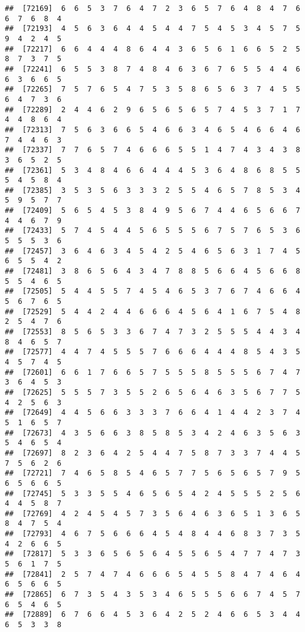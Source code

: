 \documentclass[
]{book}
\begin{document}
\begin{verbatim}
##  [72169]  6  6  5  3  7  6  4  7  2  3  6  5  7  6  4  8  4  7  6  6  7  6  8  4
##  [72193]  4  5  6  3  6  4  4  5  4  4  7  5  4  5  3  4  5  7  5  9  4  2  4  5
##  [72217]  6  6  4  4  4  8  6  4  4  3  6  5  6  1  6  6  5  2  5  8  7  3  7  5
##  [72241]  6  5  5  3  8  7  4  8  4  6  3  6  7  6  5  5  4  4  6  6  3  6  6  5
##  [72265]  7  5  7  6  5  4  7  5  3  5  8  6  5  6  3  7  4  5  5  6  4  7  3  6
##  [72289]  2  4  4  6  2  9  6  5  6  5  6  5  7  4  5  3  7  1  7  4  4  8  6  4
##  [72313]  7  5  6  3  6  6  5  4  6  6  3  4  6  5  4  6  6  4  6  7  4  4  6  3
##  [72337]  7  7  6  5  7  4  6  6  6  5  5  1  4  7  4  3  4  3  8  3  6  5  2  5
##  [72361]  5  3  4  8  4  6  6  4  4  4  5  3  6  4  8  6  8  5  5  5  4  5  8  4
##  [72385]  3  5  3  5  6  3  3  3  2  5  5  4  6  5  7  8  5  3  4  5  9  5  7  7
##  [72409]  5  6  5  4  5  3  8  4  9  5  6  7  4  4  6  5  6  6  7  4  4  6  7  9
##  [72433]  5  7  4  5  4  4  5  6  5  5  5  6  7  5  7  6  5  3  6  5  5  5  3  6
##  [72457]  3  6  4  6  3  4  5  4  2  5  4  6  5  6  3  1  7  4  5  6  5  5  4  2
##  [72481]  3  8  6  5  6  4  3  4  7  8  8  5  6  6  4  5  6  6  8  5  5  4  6  5
##  [72505]  5  4  4  5  5  7  4  5  4  6  5  3  7  6  7  4  6  6  4  5  6  7  6  5
##  [72529]  5  4  4  2  4  4  6  6  6  4  5  6  4  1  6  7  5  4  8  2  5  4  7  6
##  [72553]  8  5  6  5  3  3  6  7  4  7  3  2  5  5  5  4  4  3  4  8  4  6  5  7
##  [72577]  4  4  7  4  5  5  5  7  6  6  6  4  4  4  8  5  4  3  5  4  5  7  4  5
##  [72601]  6  6  1  7  6  6  5  7  5  5  5  8  5  5  5  6  7  4  7  3  6  4  5  3
##  [72625]  5  5  5  7  3  5  5  2  6  5  6  4  6  3  5  6  7  7  5  4  2  5  6  3
##  [72649]  4  4  5  6  6  3  3  3  7  6  6  4  1  4  4  2  3  7  4  5  1  6  5  7
##  [72673]  4  3  5  6  6  3  8  5  8  5  3  4  2  4  6  3  5  6  3  5  4  6  5  4
##  [72697]  8  2  3  6  4  2  5  4  4  7  5  8  7  3  3  7  4  4  5  7  5  6  2  6
##  [72721]  7  4  6  5  8  5  4  6  5  7  7  5  6  5  6  5  7  9  5  6  5  6  6  5
##  [72745]  5  3  3  5  5  4  6  5  6  5  4  2  4  5  5  5  2  5  6  4  4  5  8  7
##  [72769]  4  2  4  5  4  5  7  3  5  6  4  6  3  6  5  1  3  6  5  8  4  7  5  4
##  [72793]  4  6  7  5  6  6  6  4  5  4  8  4  4  6  8  3  7  3  5  4  2  6  6  5
##  [72817]  5  3  3  6  5  6  5  6  4  5  5  6  5  4  7  7  4  7  3  5  6  1  7  5
##  [72841]  2  5  7  4  7  4  6  6  6  5  4  5  5  8  4  7  4  6  4  6  5  6  6  5
##  [72865]  6  7  3  5  4  3  5  3  4  6  5  5  5  6  6  7  4  5  7  6  5  4  6  5
##  [72889]  6  7  6  6  4  5  3  6  4  2  5  2  4  6  6  5  3  4  4  6  5  3  3  8

\end{verbatim}
\end{document}
